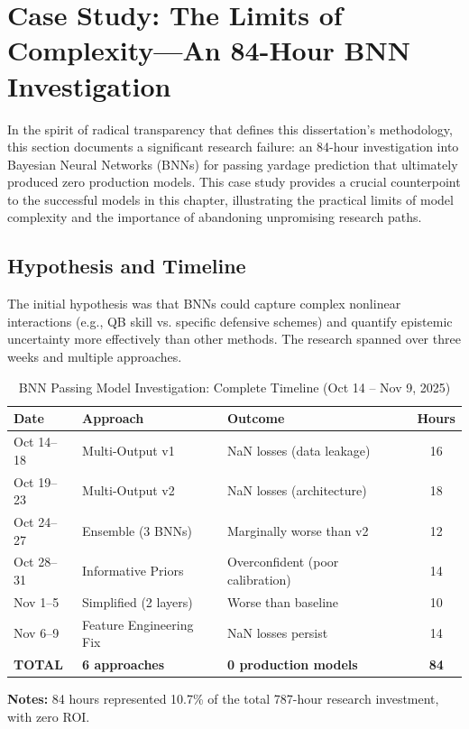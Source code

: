 \section{Case Study: The Limits of Complexity—An 84-Hour BNN Investigation}
\label{sec:bnn-failure-case-study}

In the spirit of radical transparency that defines this dissertation's methodology, this section documents a significant research failure: an 84-hour investigation into Bayesian Neural Networks (BNNs) for passing yardage prediction that ultimately produced zero production models. This case study provides a crucial counterpoint to the successful models in this chapter, illustrating the practical limits of model complexity and the importance of abandoning unpromising research paths.

\subsection{Hypothesis and Timeline}

The initial hypothesis was that BNNs could capture complex nonlinear interactions (e.g., QB skill vs. specific defensive schemes) and quantify epistemic uncertainty more effectively than other methods. The research spanned over three weeks and multiple approaches.

\begin{table}[htbp]
\centering
\caption{BNN Passing Model Investigation: Complete Timeline (Oct 14 -- Nov 9, 2025)}
\label{tab:bnn-timeline-condensed}
\begin{tabular}{@{}lllS[table-format=2.0]@{}}
\toprule
\textbf{Date} & \textbf{Approach} & \textbf{Outcome} & {\textbf{Hours}} \\
\midrule
Oct 14--18 & Multi-Output v1 & NaN losses (data leakage) & 16 \\
Oct 19--23 & Multi-Output v2 & NaN losses (architecture) & 18 \\
Oct 24--27 & Ensemble (3 BNNs) & Marginally worse than v2 & 12 \\
Oct 28--31 & Informative Priors & Overconfident (poor calibration) & 14 \\
Nov 1--5 & Simplified (2 layers) & Worse than baseline & 10 \\
Nov 6--9 & Feature Engineering Fix & NaN losses persist & 14 \\
\midrule
\textbf{TOTAL} & \textbf{6 approaches} & \textbf{0 production models} & \textbf{84} \\
\bottomrule
\end{tabular}
\begin{tablenotes}
\item \textbf{Notes:} 84 hours represented 10.7\% of the total 787-hour research investment, with zero ROI.
\end{tablenotes}
\end{table}


